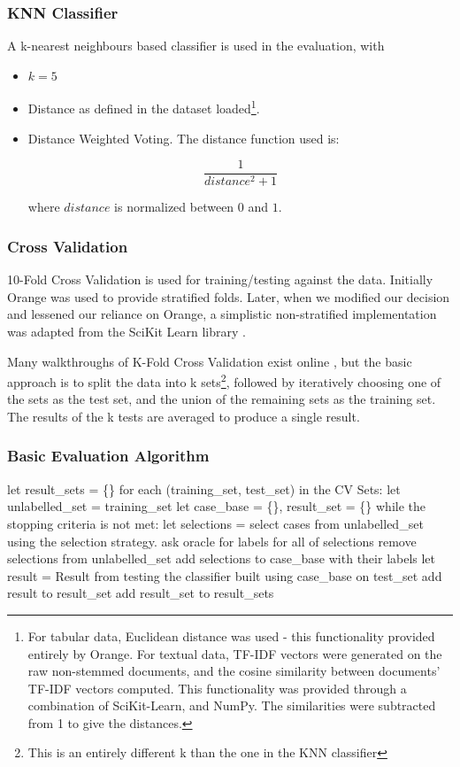 \documentclass[a4paper,11pt]{report}
\begin{document}
\subsubsection{KNN Classifier}
A k-nearest neighbours based classifier is used in the evaluation, with 
\begin{itemize}
	\item $k=5$
	\item Distance as defined in the dataset loaded\footnote {For tabular data, Euclidean distance was used - this functionality provided entirely by Orange. For textual data, TF-IDF vectors were generated on the raw non-stemmed documents, and the cosine similarity between documents' TF-IDF vectors computed. This functionality was provided through a combination of SciKit-Learn, and NumPy. The similarities were subtracted from 1 to give the distances.}.
	\item Distance Weighted Voting. The distance function used is:
	
	\[
	\frac{1}{distance^{2}+1}
	\]
	
	where $distance$ is normalized between $0$ and $1$.
	
	
\end{itemize}

\subsubsection{Cross Validation}

10-Fold Cross Validation is used for training/testing against the data. Initially Orange was used to provide stratified folds. Later, when we modified our decision and lessened our reliance on Orange, a simplistic non-stratified implementation was adapted from the SciKit Learn library \citep{prog:sklearn}.

Many walkthroughs of K-Fold Cross Validation exist online \citep{web:kfolddemo}, but the basic approach is to split the data into k sets\footnote{This is an entirely different k than the one in the KNN classifier}, followed by iteratively choosing one of the sets as the test set, and the union of the remaining sets as the training set. The results of the k tests are averaged to produce a single result.

\subsubsection{Basic Evaluation Algorithm}
\nopagebreak[4]
\begin{code}
let result_sets = \{\}
for each (training_set, test_set) in the CV Sets:
  let unlabelled_set = training_set
  let case_base = \{\}, result_set = \{\}
  while the stopping criteria is not met:
    let selections = select cases from unlabelled_set using 
                     the selection strategy.
    ask oracle for labels for all of selections
    remove selections from unlabelled_set
    add selections to case_base with their labels
    let result = Result from testing the classifier
                 built using case_base on test_set
    add result to result_set
  add result_set to result_sets
\end{code}
\end{document}
